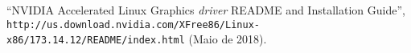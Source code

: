\documentclass[twoside,a4paper,12pt,english]{inac17}
\begin{document}
\begin{thebibliography}{99} %

 ``NVIDIA Accelerated Linux Graphics \textit{driver} README and Installation Guide'', \\\verb#http://us.download.nvidia.com/XFree86/Linux-x86/173.14.12/README/index.html# (Maio de 2018).




  

  


  
  

\end{thebibliography}
\end{document}
